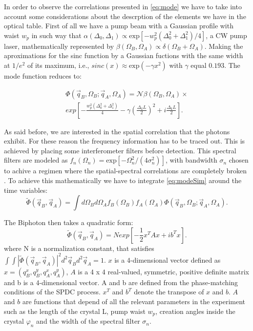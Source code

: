 In order to observe the correlations presented in \ref{eq:mode} we have to take into account some considerations about the descrption of the elements we have in the optical table.
First of all we have a pump beam with a Gaussian profile with waist $w_p$ 
in such way that $\alpha (\Delta_0,\Delta_1 ) \propto \text{exp}[-w_p^2 (\Delta_0^2 + \Delta_1^2 )/4]$, a CW pump laser, mathematically represented by
$\beta (\Omega_B , \Omega_A) \propto \delta(\Omega_B + \Omega_A)$. Making the aproximations for the sinc function by a Gaussian fuctions with the same width at $1/e^2$ of its maximum,
i.e., $sinc(x) \approx \text{exp}(-\gamma x^2)$ with $\gamma$ equal $0.193$.
The mode function reduces to:

\begin{equation}\label{eq:modeSim}
\begin{split}
\Phi(\vec{q}_B,\Omega_B;\vec{q}_A,\Omega_A) = \mathcal{N} \beta (\Omega_B , \Omega_A)
\times \\ \textit{exp}\left[ -\frac{w_p^2 (\Delta_0^2 + \Delta_1^2 )}{4}-\gamma \left(\frac{\Delta_k L}{2} \right)^2 + i\frac{\Delta_k L}{2} \right]  .
\end{split}
\end{equation}

As said before, we are interested in the spatial correlation that the photons 
exhibit. For these reason the frequency information has to be traced 
out. This is achieved by placing some interferometer filters before detection.
This spectral filters are modeled as $f_n (\Omega_n)=\text{exp}[-\Omega_n^2/(
4\sigma_n^2)]$, with bandwidth $\sigma_n$ chosen to achive a regimen where the 
spatial-spectral correlations are completely broken \cite{broke}. 
To achieve this mathematically we have to integrate \ref{eq:modeSim} around the
time variables:
\begin{equation}
\label{eq:modeSpa}
\tilde{\Phi}(\vec{q}_B,\vec{q}_A) = \int d\Omega_B d\Omega_A f_B(\Omega_B)f_A(\Omega_A) \Phi(\vec{q}_B,\Omega_B;\vec{q}_A,\Omega_A).
\end{equation}



The Biphoton then takes a quadratic form\cite{omar}:
\begin{equation}
\label{eq:quadratic}
\tilde{\Phi}(\vec{q}_B,\vec{q}_A)=N \textit{exp}\left[ -\frac{1}{2}x^T A x + i b^T x \right].
\end{equation}
where N is a normalization constant, that satisfies $\int \int | \tilde{\Phi}(\vec{q}_B,\vec{q}_A)|^2 d^2 \vec{q}_B d^2 \vec{q}_A = 1$. 
$x$ is a 4-dimensional vector defined as $x = (q^x_B, q^y_B ,q^x_A,q^y_A )$, $A$ 
is a 4 x 4 real-valued, symmetric, positive definite matrix and b is a 4-dimensional vector. 
A and b are defined from the phase-matching conditions of the SPDC process. $x^T$ and $b^T$ denote
 the transpose of $x$ and $b$. $A$ and $b$ are functions that depend of all the relevant 
parameters in the experiment such as the length of the crystal L, pump waist $w_p$, creation 
angles inside the crystal $\varphi_n$ and the width of the spectral filter $\sigma_n$.



